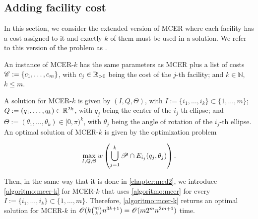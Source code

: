 \subsection{Adding facility cost}

In this section, we consider the extended version of MCER where each facility has a cost assigned to it and exactly $k$ of them must be used in a solution. We refer to this version of the problem as . 

An instance of MCER-$k$ has the same parameters as MCER plus a list of costs \mbox{$\mathscr{C}:=\{c_1, \dots, c_m\}$}, with $c_j\in\mathbb{R}_{>0}$ being the cost of the $j$-th facility; and $k\in\mathbb{N}$, $k\le m$.

A solution for MCER-$k$ is given by $(I, Q, \Theta)$, with $I:=\{i_1, \dots, i_k\}\subset \{1, \dots, m\}$; \\\mbox{$Q:=(q_1, \dots, q_k)\in\mathbb{R}^{2k}$}, with $q_j$ being the center of the $i_j$-th ellipse; and \mbox{$\Theta:=(\theta_1, \dots, \theta_k) \in [0, \pi)^k$}, with $\theta_j$ being the angle of rotation of the $i_j$-th ellipse. An optimal solution of MCER-$k$ is given by the optimization problem

\begin{equation*}
	\max_{I, Q, \Theta} w\left(\bigcup_{j=1}^k \mathscr{P} \cap E_{i_j}(q_j, \theta_j)\right).
\end{equation*}

Then, in the same way that it is done in \autoref{chapter:mcd2}, we introduce \autoref{algoritmo:mcer-k} for MCER-$k$ that uses \autoref{algoritmo:mcer} for every $I:=\{i_1, \dots, i_k\} \subset \{1, \dots, m\}$. Therefore, \autoref{algoritmo:mcer-k} returns an optimal solution for MCER-$k$ in $\mathscr{O}(k\binom{m}{k}n^{3k+1}) = \mathscr{O}(m2^mn^{3m+1})$ time.


